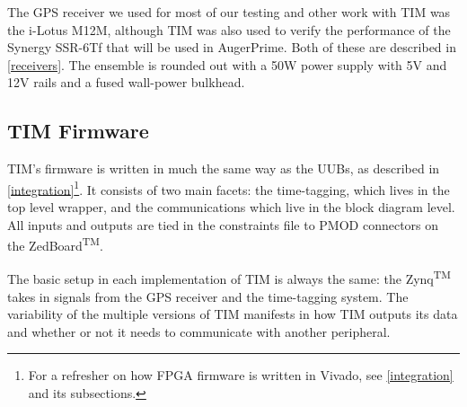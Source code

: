 The GPS receiver we used for most of our testing and other work with TIM was the i-Lotus M12M, although TIM was also used to verify the performance of the Synergy SSR-6Tf that will be used in AugerPrime. Both of these are described in \autoref{receivers}. The ensemble is rounded out with a 50W power supply with 5V and 12V rails and a fused wall-power bulkhead.

\subsection{TIM Firmware}
TIM's firmware is written in much the same way as the UUBs, as described in \autoref{integration}\footnote{For a refresher on how FPGA firmware is written in Vivado, see \autoref{integration} and its subsections.}. It consists of two main facets: the time-tagging, which lives in the top level wrapper, and the communications which live in the block diagram level. All inputs and outputs are tied in the constraints file to PMOD connectors on the ZedBoard\textsuperscript{TM}.

The basic setup in each implementation of TIM is always the same: the Zynq\textsuperscript{TM} takes in signals from the GPS receiver and the time-tagging system. The variability of the multiple versions of TIM manifests in how TIM outputs its data and whether or not it needs to communicate with another peripheral. 
